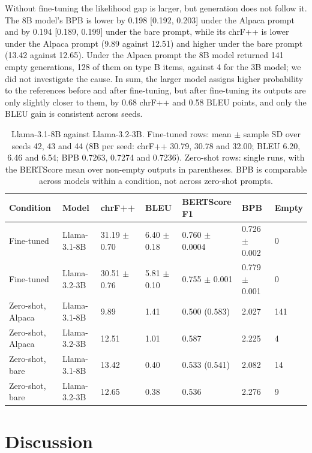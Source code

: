 \documentclass{article}
\begin{document}
Without fine-tuning the likelihood gap is larger, but generation does not follow it. The 8B model's BPB is lower by 0.198 [0.192, 0.203] under the Alpaca prompt and by 0.194 [0.189, 0.199] under the bare prompt, while its chrF++ is lower under the Alpaca prompt (9.89 against 12.51) and higher under the bare prompt (13.42 against 12.65). Under the Alpaca prompt the 8B model returned 141 empty generations, 128 of them on type B items, against 4 for the 3B model; we did not investigate the cause. In sum, the larger model assigns higher probability to the references before and after fine-tuning, but after fine-tuning its outputs are only slightly closer to them, by 0.68 chrF++ and 0.58 BLEU points, and only the BLEU gain is consistent across seeds.

\begin{table}[tbp]
\centering
\fontsize{8.5}{10}\selectfont
\setlength{\tabcolsep}{3pt}
\caption{Llama-3.1-8B against Llama-3.2-3B. Fine-tuned rows: mean $\pm$ sample SD over seeds 42, 43 and 44 (8B per seed: chrF++ 30.79, 30.78 and 32.00; BLEU 6.20, 6.46 and 6.54; BPB 0.7263, 0.7274 and 0.7236). Zero-shot rows: single runs, with the BERTScore mean over non-empty outputs in parentheses. BPB is comparable across models within a condition, not across zero-shot prompts.}\label{tab:8b}
\begin{tabular}{@{}L{87.6pt}L{67.7pt}R{56.9pt}R{52.0pt}R{69.7pt}R{61.2pt}R{32.7pt}@{}}
\toprule
\textbf{Condition} & \textbf{Model} & \textbf{chrF++} & \textbf{BLEU} & \textbf{BERTScore F1} & \textbf{BPB} & \textbf{Empty} \\
\midrule
Fine-tuned & Llama-3.1-8B & 31.19 $\pm$ 0.70 & 6.40 $\pm$ 0.18 & 0.760 $\pm$ 0.0004 & 0.726 $\pm$ 0.002 & 0 \\
Fine-tuned & Llama-3.2-3B & 30.51 $\pm$ 0.76 & 5.81 $\pm$ 0.10 & 0.755 $\pm$ 0.001 & 0.779 $\pm$ 0.001 & 0 \\
Zero-shot, Alpaca & Llama-3.1-8B & 9.89 & 1.41 & 0.500 (0.583) & 2.027 & 141 \\
Zero-shot, Alpaca & Llama-3.2-3B & 12.51 & 1.01 & 0.587 & 2.225 & 4 \\
Zero-shot, bare & Llama-3.1-8B & 13.42 & 0.40 & 0.533 (0.541) & 2.082 & 14 \\
Zero-shot, bare & Llama-3.2-3B & 12.65 & 0.38 & 0.536 & 2.276 & 9 \\
\bottomrule
\end{tabular}
\end{table}

\section{Discussion}\label{sec:discussion}
\end{document}
